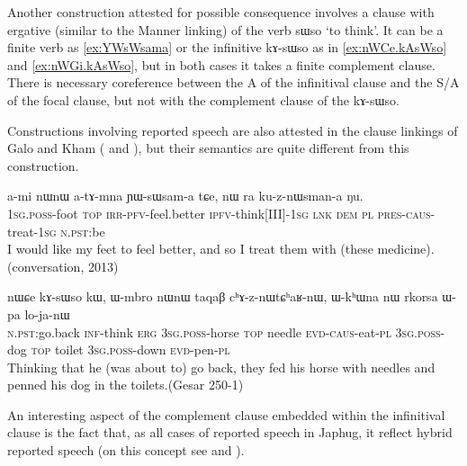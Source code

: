\documentclass[oldfontcommands,oneside,a4paper,11pt]{article}
\newcommand{\ipa}[1]{{\phon \mbox{#1}}} %
\begin{document}
 Another construction attested for possible consequence involves a clause with ergative (similar to the Manner linking) of the verb \ipa{sɯso} `to think'. It can be a finite verb as \ref{ex:YWsWsama} or the infinitive \ipa{kɤ-sɯso} as in \ref{ex:nWCe.kAsWso} and \ref{ex:nWGi.kAsWso}, but in both cases it  takes a finite complement clause.  There is necessary coreference between the A of the infinitival clause and the S/A of the focal clause, but not with the complement clause of the  \ipa{kɤ-sɯso}. 
 
 Constructions involving reported speech are also attested in the clause linkings  of Galo and Kham  (\citealt[86, 88]{post09linking} and \citealt[110]{watters09kham}), but their semantics are quite different from this construction.
 
   \begin{exe}
\ex \label{ex:YWsWsama}
\gll 
\ipa{a-mi}  	\ipa{nɯnɯ}  	\ipa{a-tɤ-mna}  	\ipa{ɲɯ-sɯsam-a}  	\ipa{tɕe,}  	\ipa{nɯ} \ipa{ra}  	\ipa{ku-z-nɯsman-a}  	\ipa{ŋu.}   \\
\textsc{1sg.poss}-foot \textsc{top} \textsc{irr-pfv}-feel.better  \textsc{ipfv}-think[III]-\textsc{1sg} \textsc{lnk} \textsc{dem} \textsc{pl} \textsc{pres-caus}-treat-\textsc{1sg}  \textsc{n.pst}:be \\
\glt I would like my feet to feel better, and so I treat them with (these medicine). (conversation, 2013)
  \end{exe}
 
  \begin{exe}
\ex \label{ex:nWCe.kAsWso}
\gll 
\ipa{nɯɕe}  	\ipa{kɤ-sɯso}  	\ipa{kɯ,}  	\ipa{ɯ-mbro}  	\ipa{nɯnɯ}  	\ipa{taqaβ}  	\ipa{cʰɤ-z-nɯtɕʰaʁ-nɯ,}  	\ipa{ɯ-kʰɯna}  	\ipa{nɯ}  	\ipa{rkorsa}  	\ipa{ɯ-pa}  	\ipa{lo-ja-nɯ}  \\
\textsc{n.pst}:go.back \textsc{inf}-think \textsc{erg} \textsc{3sg.poss}-horse \textsc{top} needle \textsc{evd-caus}-eat-\textsc{pl}   \textsc{3sg.poss}-dog \textsc{top} toilet \textsc{3sg.poss}-down \textsc{evd}-pen-\textsc{pl} \\
\glt Thinking that he (was about to) go back, they fed his horse with needles and penned his dog in the toilets.(Gesar 250-1)
 \end{exe}
 
An interesting aspect  of the complement clause embedded within the infinitival clause is the fact that, as all cases of reported speech in Japhug, it reflect hybrid reported speech (on this concept see \citealt{tournadre08conjunct} and \citealt{aikhenvald08semidirect}).
 
\end{document}
